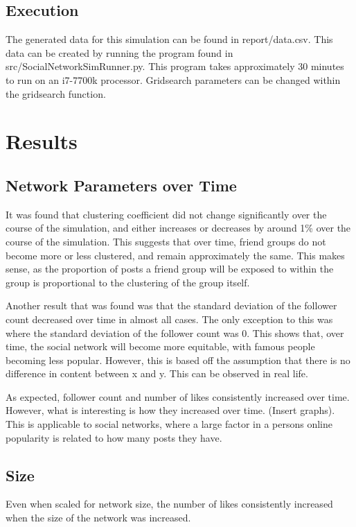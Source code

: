 \documentclass{article}
\begin{document}
\subsection{Execution}
The generated data for this simulation can be found in report/data.csv.
This data can be created by running the program found in src/SocialNetworkSimRunner.py.
This program takes approximately 30 minutes to run on an i7-7700k processor.
Gridsearch parameters can be changed within the gridsearch function.

\section{Results}

\subsection{Network Parameters over Time}
It was found that clustering coefficient did not change significantly over the
course of the simulation, and either increases or decreases by around 1\% over the course of the simulation.
This suggests that over time, friend groups do not become more or less clustered, and remain approximately the same.
This makes sense, as the proportion of posts a friend group will be exposed to within the group
is proportional to the clustering of the group itself.

Another result that was found was that the standard deviation of the follower count
decreased over time in almost all cases. The only exception to this was where the
standard deviation of the follower count was 0. This shows that, over time, the
social network will become more equitable, with famous people becoming less popular.
However, this is based off the assumption that there is no difference
in content between x and y. This can be observed in real life.

As expected, follower count and number of likes consistently increased over time.
However, what is interesting is how they increased over time. (Insert graphs).
This is applicable to social networks, where a large factor in a persons online popularity
is related to how many posts they have.

\subsection{Size}
Even when scaled for network size, the number of likes consistently increased
when the size of the network was increased.
\end{document}
